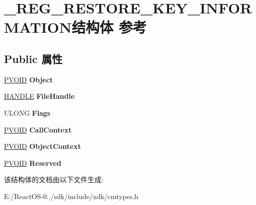 \hypertarget{struct___r_e_g___r_e_s_t_o_r_e___k_e_y___i_n_f_o_r_m_a_t_i_o_n}{}\section{\+\_\+\+R\+E\+G\+\_\+\+R\+E\+S\+T\+O\+R\+E\+\_\+\+K\+E\+Y\+\_\+\+I\+N\+F\+O\+R\+M\+A\+T\+I\+O\+N结构体 参考}
\label{struct___r_e_g___r_e_s_t_o_r_e___k_e_y___i_n_f_o_r_m_a_t_i_o_n}
\subsection*{Public 属性}
\begin{DoxyCompactItemize}
\item 
\mbox{\label{struct___r_e_g___r_e_s_t_o_r_e___k_e_y___i_n_f_o_r_m_a_t_i_o_n_a7a949604a5c13091450d0553225df0d3}} 
\hyperlink{interfacevoid}{P\+V\+O\+ID} {\bfseries Object}
\item 
\mbox{\label{struct___r_e_g___r_e_s_t_o_r_e___k_e_y___i_n_f_o_r_m_a_t_i_o_n_a17b6b548adeee7eb02597a654421995f}} 
\hyperlink{interfacevoid}{H\+A\+N\+D\+LE} {\bfseries File\+Handle}
\item 
\mbox{\label{struct___r_e_g___r_e_s_t_o_r_e___k_e_y___i_n_f_o_r_m_a_t_i_o_n_a471e3099589cd2c8aa6824ecf4ed73a2}} 
U\+L\+O\+NG {\bfseries Flags}
\item 
\mbox{\label{struct___r_e_g___r_e_s_t_o_r_e___k_e_y___i_n_f_o_r_m_a_t_i_o_n_ac83b492e04678e66061a8a43c20a04a8}} 
\hyperlink{interfacevoid}{P\+V\+O\+ID} {\bfseries Call\+Context}
\item 
\mbox{\label{struct___r_e_g___r_e_s_t_o_r_e___k_e_y___i_n_f_o_r_m_a_t_i_o_n_a5bd23c7dbb15018d5e1ed35be8770845}} 
\hyperlink{interfacevoid}{P\+V\+O\+ID} {\bfseries Object\+Context}
\item 
\mbox{\label{struct___r_e_g___r_e_s_t_o_r_e___k_e_y___i_n_f_o_r_m_a_t_i_o_n_aadc198480d99b014b4b75f975fdeae6f}} 
\hyperlink{interfacevoid}{P\+V\+O\+ID} {\bfseries Reserved}
\end{DoxyCompactItemize}


该结构体的文档由以下文件生成\+:\begin{DoxyCompactItemize}
\item 
E\+:/\+React\+O\+S-\/0../sdk/include/xdk/cmtypes.\+h\end{DoxyCompactItemize}
